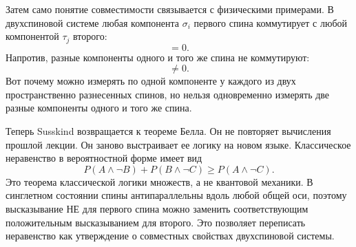 Затем само понятие совместимости связывается с физическими примерами. В двухспиновой системе любая компонента \(\sigma_i\) первого спина коммутирует с любой компонентой \(\tau_j\) второго:
\begin{equation}
[\sigma_i,\tau_j]=0.
\end{equation}
Напротив, разные компоненты одного и того же спина не коммутируют:
\begin{equation}
[\sigma_1,\sigma_3]\neq 0.
\end{equation}
Вот почему можно измерять по одной компоненте у каждого из двух пространственно разнесенных спинов, но нельзя одновременно измерять две разные компоненты одного и того же спина.

\begin{classroomqa}
\end{classroomqa}

\begin{classroomqa}
\end{classroomqa}

\begin{classroomqa}
\end{classroomqa}

Теперь Susskind возвращается к теореме Белла. Он не повторяет вычисления прошлой лекции. Он заново выстраивает ее логику на новом языке. Классическое неравенство в вероятностной форме имеет вид
\begin{equation}
P(A\wedge \neg B)+P(B\wedge \neg C)\ge P(A\wedge \neg C).
\end{equation}
Это теорема классической логики множеств, а не квантовой механики. В синглетном состоянии спины антипараллельны вдоль любой общей оси, поэтому высказывание НЕ для первого спина можно заменить соответствующим положительным высказыванием для второго. Это позволяет переписать неравенство как утверждение о совместных свойствах двухспиновой системы.

